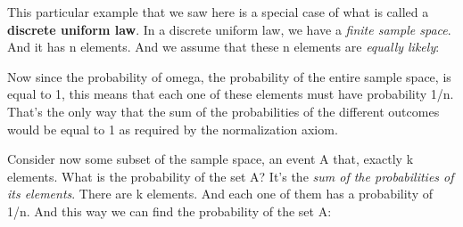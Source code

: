 \documentclass[pdftex, brazil, 12pt, twoside]{article}
\begin{document}
\begin{figure}[H]
  \begin{center}
  \end{center}
\end{figure}

This particular example that we saw here is a special case
of what is called a \textbf{discrete uniform law}.
In a discrete uniform law, we have a \emph{finite sample
space}. And it has n elements.
And we assume that these n elements are \emph{equally likely}:

\begin{figure}[H]
  \begin{center}
  \end{center}
\end{figure}

Now since the probability of omega, the probability of the
entire sample space, is equal to 1, this means that each one
of these elements must have probability 1/n.
That's the only way that the sum of the probabilities of
the different outcomes would be equal to 1 as required by
the normalization axiom.

Consider now some subset of the sample space, an event A
that, exactly k elements.
What is the probability of the set A?
It's the \emph{sum of the probabilities of its elements}.
There are k elements.
And each one of them has a probability of 1/n.
And this way we can find the probability of the set A:
\end{document}

